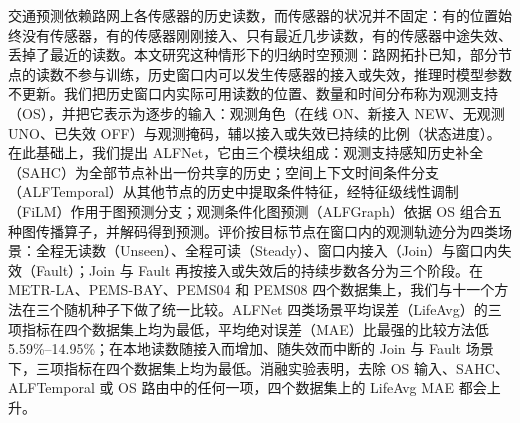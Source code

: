 交通预测依赖路网上各传感器的历史读数，而传感器的状况并不固定：有的位置始终没有传感器，有的传感器刚刚接入、只有最近几步读数，有的传感器中途失效、丢掉了最近的读数。本文研究这种情形下的归纳时空预测：路网拓扑已知，部分节点的读数不参与训练，历史窗口内可以发生传感器的接入或失效，推理时模型参数不更新。我们把历史窗口内实际可用读数的位置、数量和时间分布称为观测支持（OS），并把它表示为逐步的输入：观测角色（在线 ON、新接入 NEW、无观测 UNO、已失效 OFF）与观测掩码，辅以接入或失效已持续的比例（状态进度）。在此基础上，我们提出 ALFNet，它由三个模块组成：观测支持感知历史补全（SAHC）为全部节点补出一份共享的历史；空间上下文时间条件分支（ALFTemporal）从其他节点的历史中提取条件特征，经特征级线性调制（FiLM）作用于图预测分支；观测条件化图预测（ALFGraph）依据 OS 组合五种图传播算子，并解码得到预测。评价按目标节点在窗口内的观测轨迹分为四类场景：全程无读数（Unseen）、全程可读（Steady）、窗口内接入（Join）与窗口内失效（Fault）；Join 与 Fault 再按接入或失效后的持续步数各分为三个阶段。在 METR-LA、PEMS-BAY、PEMS04 和 PEMS08 四个数据集上，我们与十一个方法在三个随机种子下做了统一比较。ALFNet 四类场景平均误差（LifeAvg）的三项指标在四个数据集上均为最低，平均绝对误差（MAE）比最强的比较方法低5.59\%–14.95\%；在本地读数随接入而增加、随失效而中断的 Join 与 Fault 场景下，三项指标在四个数据集上均为最低。消融实验表明，去除 OS 输入、SAHC、ALFTemporal 或 OS 路由中的任何一项，四个数据集上的 LifeAvg MAE 都会上升。
